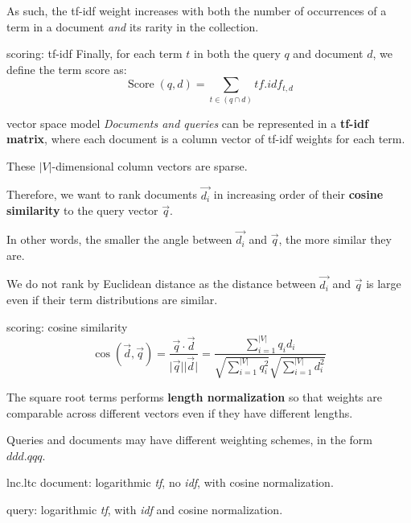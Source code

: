 As such, the tf-idf weight increases with both the number of occurrences of a term in a document \textit{and} its rarity in the collection.

\begin{defn}{scoring: tf-idf}
    Finally, for each term $t$ in both the query $q$ and document $d$, we define the term score as: \vspace{0.8em}
    \[ \operatorname*{Score}(q, d) = \sum_{t \in (q \cap d)} tf.idf_{t,d} \]
\end{defn}

\begin{defn}{vector space model}
    \textit{Documents and queries} can be represented in a \textbf{tf-idf matrix}, where each document is a column vector of tf-idf weights for each term.

    These $|V|$-dimensional column vectors are sparse.
\end{defn}

Therefore, we want to rank documents $\overrightarrow{d_i}$ in increasing order of their \textbf{cosine similarity} to the query vector $\overrightarrow{q}$.

In other words, the smaller the angle between $\overrightarrow{d_i}$ and $\overrightarrow{q}$, the more similar they are.

We do not rank by Euclidean distance as the distance between $\overrightarrow{d_i}$ and $\overrightarrow{q}$ is large even if their term distributions are similar.

\begin{defn}{scoring: cosine similarity}
    \[
        \cos(\overrightarrow{d}, \overrightarrow{q})
        = \frac{\overrightarrow{q} \cdot \overrightarrow{d}}{\lvert \overrightarrow{q} \rvert \lvert \overrightarrow{d} \rvert}
        = \frac{\sum_{i=1}^{|V|}q_i d_i}{\sqrt{\sum_{i=1}^{|V|} q_i^2} \sqrt{\sum_{i=1}^{|V|} d_i^2}}
    \]

    The square root terms performs \textbf{length normalization} so that weights are comparable across different vectors even if they have different lengths.
\end{defn}

Queries and documents may have different weighting schemes, in the form $ddd.qqq$.

\begin{defn}{lnc.ltc}
    document: logarithmic \textit{tf}, no \textit{idf}, with cosine normalization.

    query: logarithmic \textit{tf}, with \textit{idf} and cosine normalization.
\end{defn}